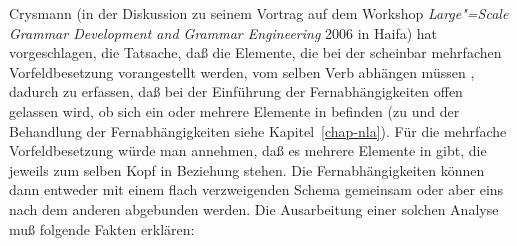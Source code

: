 Crysmann (in der Diskussion zu seinem Vortrag auf dem Workshop \emph{Large"=Scale Grammar Development and Grammar Engineering} 
2006 in Haifa) hat vorgeschlagen, die Tatsache, daß die Elemente, die bei der scheinbar mehrfachen Vorfeldbesetzung
vorangestellt werden, vom selben Verb abhängen müssen \citep[]{Fanselow93a}, dadurch zu erfassen, daß bei der Einführung
der Fernabhängigkeiten offen gelassen wird, ob sich ein oder mehrere Elemente in \slasch befinden
(zu \slasch und der Behandlung der Fernabhängigkeiten siehe Kapitel~\ref{chap-nla}).
Für die mehrfache Vorfeldbesetzung würde man annehmen, daß es mehrere Elemente in \slasch gibt,
die jeweils zum selben Kopf in Beziehung stehen. Die Fernabhängigkeiten können dann entweder mit einem
flach verzweigenden Schema gemeinsam oder aber eins nach dem anderen abgebunden werden.
Die Ausarbeitung einer solchen Analyse muß folgende Fakten erklären:
